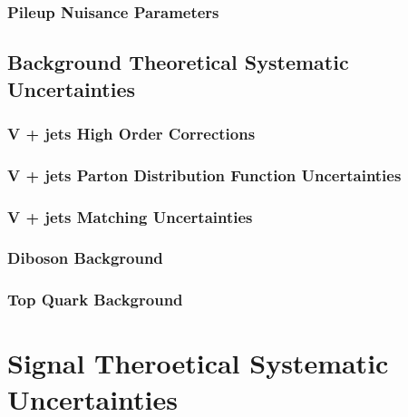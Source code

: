 \documentclass[10pt,twoside,cucitura,classica,english,openany]{toptesi}
\begin{document}


\subsubsection{Pileup Nuisance Parameters}
\label{sec:pile-nuis-param}



\subsection{Background Theoretical Systematic Uncertainties}
\label{sec:backgr-theor-syst}



\subsubsection{V + jets High Order Corrections}
\label{sec:v-+-jets}



\subsubsection{V + jets Parton Distribution Function Uncertainties}
\label{sec:v-+-jets-pdf}



\subsubsection{V + jets Matching Uncertainties}
\label{sec:v-+-jets-matching}



\subsubsection{Diboson Background}
\label{sec:diboson-background}



\subsubsection{Top Quark Background}
\label{sec:top-quark-background}



\section{Signal Theroetical Systematic Uncertainties}
\label{sec:ther-syst-uncert}
\end{document}
